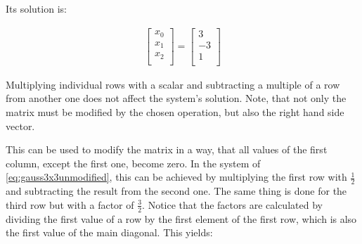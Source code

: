 Its solution is:

\begin{align*}
\begin{bmatrix}
	x_0\\
	x_1\\
	x_2\\
\end{bmatrix}
=
\begin{bmatrix}
	3\\
	-3\\
	1\\
\end{bmatrix}
\end{align*}


Multiplying individual rows with a scalar and subtracting a multiple of a row from another one does not affect the system's solution.
Note, that not only the matrix must be modified by the chosen operation, but also the right hand side vector.


This can be used to modify the matrix in a way, that all values of the first column, except the first one, become zero.
In the system of \cref{eq:gauss3x3unmodified}, this can be achieved by multiplying the first row with $\frac{1}{2}$ and subtracting the result from the second one.
The same thing is done for the third row but with a factor of $\frac{3}{2}$.
Notice that the factors are calculated by dividing the first value of a row by the first element of the first row, which is also the first value of the main diagonal.
This yields:

